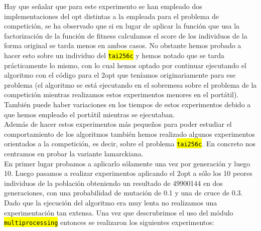 \documentclass[10pt,a4paper]{article}
\newcommand{\code}[1]{\sethlcolor{light-gray}\hl{\texttt{#1}}} %
\begin{document}
Hay que señalar que para este experimento se han empleado dos implementaciones del opt distintas a la empleada para el problema de competición, se ha observado que si en lugar de aplicar la función que usa la factorización de la función de fitness calculamos el score de los individuos de la forma original se tarda menos en ambos casos. No obstante hemos probado a hacer esto sobre un individuo del \code{tai256c} y hemos notado que se tarda prácticamente lo mismo, con lo cual hemos optado por continuar ejecutando el algoritmo con el código para el 2opt que teníamos originariamente para ese problema (el algoritmo se está ejecutando en el sobremesa sobre el problema de la competición mientras realizamos estos experimentos menores en el portátil). También puede haber variaciones en los tiempos de estos experimentos debido a que hemos empleado el portátil mientras se ejecutaban.\\

Además de hacer estos experimentos más pequeños para poder estudiar el comportamiento de los algoritmos también hemos realizado algunos experimentos orientados a la competición, es decir, sobre el problema \code{tai256c}. En concreto nos centramos en probar la variante lamarckiana.\\

En primer lugar probamos a aplicarlo sólamente una vez por generación y luego 10. Luego pasamos a realizar experimentos aplicando el 2opt a sólo los 10 peores individuos de la población obteniendo un resultado de 49900144 en dos generaciones, con una probabilidad de mutación de 0.1 y una de cruce de 0.3. Dado que la ejecución del algoritmo era muy lenta no realizamos una experimentación tan extensa. Una vez que descrubrimos el uso del módulo \code{multiprocessing} entonces se realizaron los siguientes experimentos:
\end{document}
